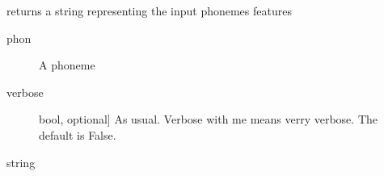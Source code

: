 \documentclass[letterpaper,10pt,english]{sphinxmanual}
\begin{document}
\begin{fulllineitems}
\begin{fulllineitems}
\label{\detokenize{index:IPA.IPA.get_char}}
\sphinxAtStartPar
returns a string representing the input phoneme\textquotesingle{}s features
\begin{description}
\item[{phon}] \leavevmode{[}{]}
\sphinxAtStartPar
A phoneme

\item[{verbose}] \leavevmode{[}bool, optional{]}
\sphinxAtStartPar
As usual. Verbose with me means verry verbose. The default is False.

\end{description}

\sphinxAtStartPar
string

\end{fulllineitems}


\end{fulllineitems}

\end{document}

